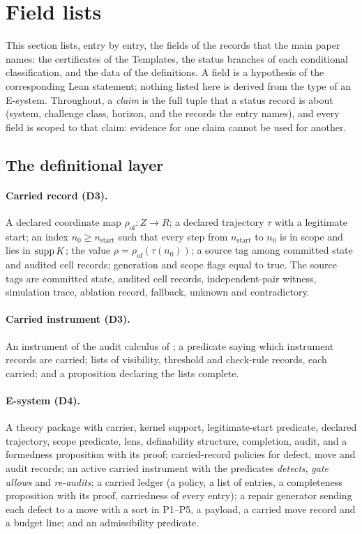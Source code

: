 \section{Field lists}
\label{supp:fields}

This section lists, entry by entry, the fields of the records that the main paper names: the
certificates of the Templates, the status branches of each conditional classification, and the data
of the definitions. A field is a hypothesis of the corresponding Lean statement; nothing listed here
is derived from the type of an E-system. Throughout, a \emph{claim} is the full tuple that a status
record is about (system, challenge class, horizon, and the records the entry names), and every field
is scoped to that claim: evidence for one claim cannot be used for another.

\subsection{The definitional layer}

\paragraph{Carried record (D3).} A declared coordinate map $\rho_{\mathrm{of}} : Z \to R$; a
declared trajectory $\tau$ with a legitimate start; an index $n_0 \ge n_{\mathrm{start}}$ such that
every step from $n_{\mathrm{start}}$ to $n_0$ is in scope and lies in $\operatorname{supp} K$; the value
$\rho = \rho_{\mathrm{of}}(\tau(n_0))$; a source tag among committed state and audited cell records;
generation and scope flags equal to true. The source tags are committed state, audited cell records,
independent-pair witness, simulation trace, ablation record, fallback, unknown and contradictory.

\paragraph{Carried instrument (D3).} An instrument of the audit calculus of \FoundIII{}; a predicate
saying which instrument records are carried; lists of visibility, threshold and check-rule records,
each carried; and a proposition declaring the lists complete.

\paragraph{E-system (D4).} A theory package with carrier, kernel support, legitimate-start predicate,
declared trajectory, scope predicate, lens, definability structure, completion, audit, and a
formedness proposition with its proof; carried-record policies for defect, move and audit records; an
active carried instrument with the predicates \emph{detects}, \emph{gate allows} and
\emph{re-audits}; a carried ledger (a policy, a list of entries, a completeness proposition with its
proof, carriedness of every entry); a repair generator sending each defect to a move with a sort in
P1--P5, a payload, a carried move record and a budget line; and an admissibility predicate.

